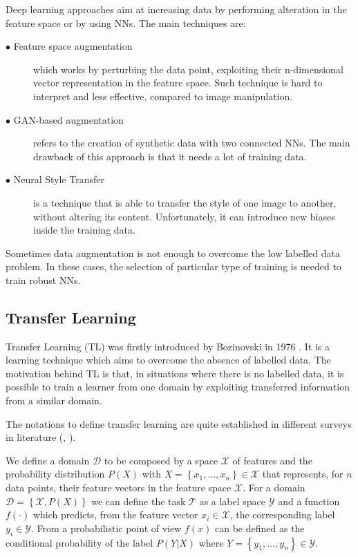 \documentclass[../main.tex]{subfiles}
\begin{document}
Deep learning approaches aim at increasing data by performing alteration in the feature space or by using NNs. The main techniques are:

\begin{description}
\item[$\bullet$ Feature space augmentation] which works by perturbing the data point, exploiting their n-dimensional vector representation in the feature space. 
Such technique is hard to interpret and less effective, compared to image manipulation.
\item[$\bullet$ GAN-based augmentation] refers to the creation of synthetic data with two connected NNs.
The main drawback of this approach is that it needs a lot of training data.
\item[$\bullet$ Neural Style Transfer] is a technique that is able to transfer the style of one image to another, without altering its content. 
Unfortunately, it can introduce new biases inside the training data.
\end{description}
Sometimes data augmentation is not enough to overcome the low labelled data problem. 
In these cases, the selection of particular type of training is needed to train robust NNs.

\subsection{Transfer Learning}\label{sec:tl}

Transfer Learning (TL)  was firstly introduced by Bozinovski in 1976 \cite{bozinovski2020reminder}. It is a learning technique which aims to overcome the absence of labelled data. 
The motivation behind TL is that, in situations where there is no labelled data, it is possible to train a learner from one domain by exploiting transferred information from a similar domain.

The notations to define transfer learning are quite established in different surveys in literature (\cite{weiss2016survey-tranfer-learning1}, \cite{pan2009survey-tranfer-learning2}).

We define a domain $\mathcal{D}$ to be composed by a space $\mathcal{X}$ of features and the probability distribution $P(X)$ with $X=\left\{x_1, \dots, x_n\right\}\in \mathcal{X}$ that represents, for $n$ data points, their feature vectors in the feature space $\mathcal{X}$. 
For a domain $\mathcal{D}=\left\{\mathcal{X}, P(X)\right\}$ we can define the task $\mathcal{T}$ as a label space $\mathcal{Y}$ and a function $f(\cdot)$ which predicts, from the feature vector $x_i \in \mathcal{X}$, the corresponding label $y_i \in \mathcal{Y}$.
From a probabilistic point of view $f(x)$ can be defined as the conditional probability of the label $P(Y|X)$ where $Y=\left\{y_1, \dots, y_n\right\}\in \mathcal{Y}$.
\end{document}
